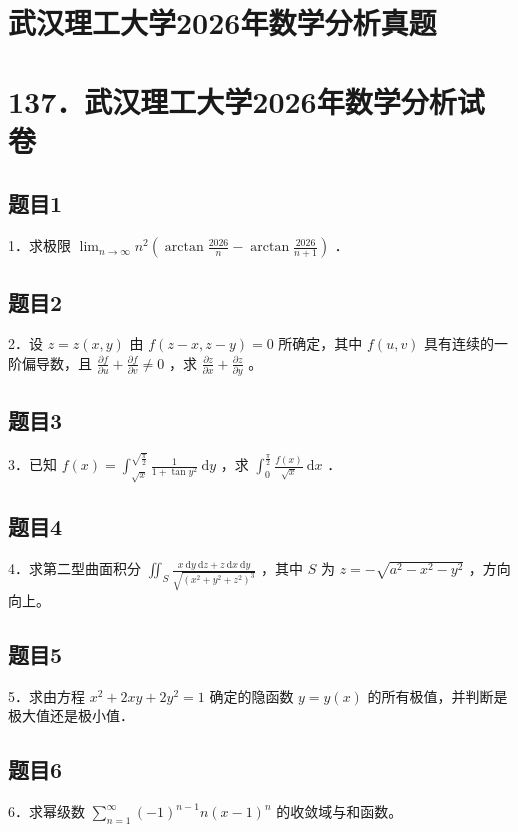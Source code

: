 \documentclass{article}
\begin{document}
\section*{武汉理工大学2026年数学分析真题}
\section*{137．武汉理工大学2026年数学分析试卷}

\subsection{题目1}
1．求极限 \(\lim _{n \rightarrow \infty} n^{2}\left(\arctan \frac{2026}{n}-\arctan \frac{2026}{n+1}\right)\) ．

\subsection{题目2}
2．设 \(z=z(x, y)\) 由 \(f(z-x, z-y)=0\) 所确定，其中 \(f(u, v)\) 具有连续的一阶偏导数，且 \(\frac{\partial f}{\partial u}+\frac{\partial f}{\partial v} \neq 0\) ，求 \(\frac{\partial z}{\partial x}+\frac{\partial z}{\partial y}\) 。

\subsection{题目3}
3．已知 \(f(x)=\int_{\sqrt{x}}^{\sqrt{\frac{\pi}{2}}} \frac{1}{1+\tan y^{2}} \mathrm{~d} y\) ，求 \(\int_{0}^{\frac{\pi}{2}} \frac{f(x)}{\sqrt{x}} \mathrm{~d} x\) ．

\subsection{题目4}
4．求第二型曲面积分 \(\iint_{S} \frac{x \mathrm{~d} y \mathrm{~d} z+z \mathrm{~d} x \mathrm{~d} y}{\sqrt{\left(x^{2}+y^{2}+z^{2}\right)^{3}}}\) ，其中 \(S\) 为 \(z=-\sqrt{a^{2}-x^{2}-y^{2}}\) ，方向向上。

\subsection{题目5}
5．求由方程 \(x^{2}+2 x y+2 y^{2}=1\) 确定的隐函数 \(y=y(x)\) 的所有极值，并判断是极大值还是极小值．

\subsection{题目6}
6．求幂级数 \(\sum_{n=1}^{\infty}(-1)^{n-1} n(x-1)^{n}\) 的收敛域与和函数。
\end{document}
